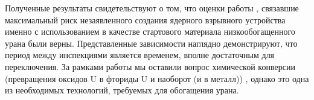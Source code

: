 Полученные результаты свидетельствуют о том, что оценки работы \cite{rumyanc}, связавшие максимальный риск незаявленного создания ядерного взрывного устройства именно с использованием в качестве стартового материала низкообогащенного урана были  верны. Представленные зависимости наглядно демонстрируют, что период между инспекциями является временем, вполне достаточным для переключения. За рамками работы мы оставили вопрос химической конверсии (превращения оксидов U в фториды U и наоборот (и в металл)) \cite{Orlov2017}, однако это одна из необходимых технологий, требуемых для обогащения урана. 



